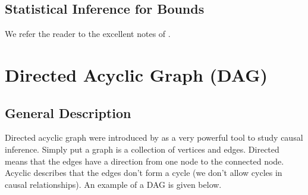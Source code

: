 \documentclass[11pt]{exam}
\begin{document}


\subsection{Statistical Inference for Bounds}
We refer the reader to the excellent notes of \citet[Section~7.5.4]{chazal2024causalcoursenotes}.

\newpage

\section{Directed Acyclic Graph (DAG)}
\subsection{General Description}
Directed acyclic graph were introduced by \citet{pearl2000models} as a very powerful tool to study causal inference. Simply put a graph is a collection of vertices and edges. Directed means that the edges have a direction from one node to the connected node. Acyclic describes that the edges don't form a cycle (we don't allow cycles in causal relationships). An example of a DAG is given below.
\end{document}
